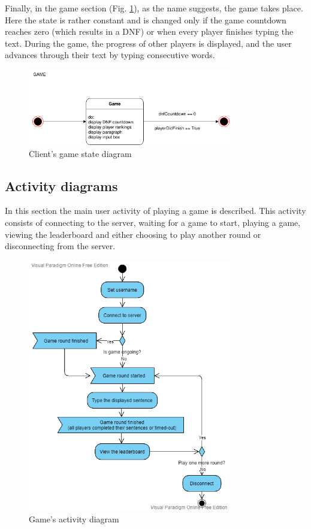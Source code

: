 \documentclass[titlepage]{article}
\newcommand{\figref}[1]{{(Fig. \hypersetup{linkcolor=blue}\ref{#1})}}
\begin{document}
Finally, in the game section \figref{fig:state-client-game}, as the name suggests, the game takes place. Here the state is rather constant and is changed only if the game countdown reaches zero (which results in a DNF) or when every player finishes typing the text. During the game, the progress of other players is displayed, and the user advances through their text by typing consecutive words.

\begin{figure}[H]
	\centering
	\includegraphics[width=0.79\textwidth]{state_diagram_game.png}
	\caption{Client's game state diagram}
	\label{fig:state-client-game}
\end{figure}

\subsection{Activity diagrams}

In this section the main user activity of playing a game is described. This activity consists of connecting to the server, waiting for a game to start, playing a game, viewing the leaderboard and either choosing to play another round or disconnecting from the server.


\begin{figure}[H]
	\centering
	\includegraphics[width=0.79\textwidth]{activity_diagram_game.png}
	\caption{Game's activity diagram}
	\label{fig:game-activity}
\end{figure}
\end{document}

